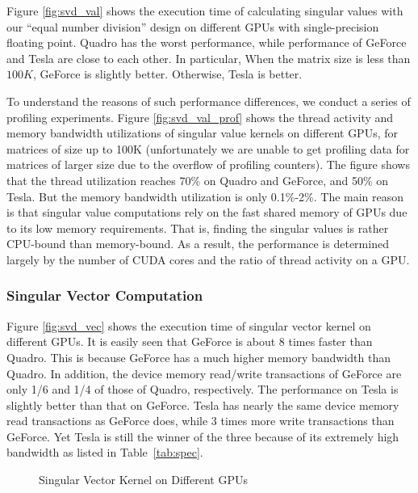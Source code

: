 Figure \ref{fig:svd_val} shows the execution time of calculating singular values with our ``equal number division'' design on different GPUs with single-precision floating point.
Quadro has the worst performance, while performance of GeForce and Tesla are close to each other.
In particular, When the matrix size is less than $100K$, GeForce is slightly better. Otherwise, Tesla is better. 

To understand the reasons
of such performance differences, we conduct a series of profiling experiments.
Figure \ref{fig:svd_val_prof} shows the thread activity and memory bandwidth utilizations of singular value kernels on different GPUs, for matrices of size up to 
100K (unfortunately we are unable to get profiling data for matrices of larger size due to the overflow of profiling counters). 
The figure shows that the thread utilization reaches 70\% on Quadro and GeForce, and 50\% on Tesla. 
But the memory bandwidth utilization is only 0.1\%-2\%.
The main reason is that singular value computations rely on the fast shared memory
of GPUs due to its low memory requirements. That is, finding the singular
values is rather CPU-bound than memory-bound. 
As a result, the performance is determined largely by the number of CUDA cores and the ratio of thread activity on a GPU.

\subsubsection{Singular Vector Computation}
Figure \ref{fig:svd_vec} shows the execution time of singular vector kernel on different GPUs. 
It is easily seen that GeForce is about 8 times faster than
Quadro. This is because GeForce has a much higher memory bandwidth
than Quadro.
In addition, the device memory read/write transactions of GeForce are only 1/6 and 1/4 of those of Quadro, respectively.
The performance on Tesla is slightly better than that on GeForce.
Tesla has nearly the same device memory read transactions as GeForce does, while 3 times more write transactions than GeForce.
Yet Tesla is still the winner of the three because of its extremely high
bandwidth as listed in Table~\ref{tab:spec}.

\begin{figure}[hbpt]
\centering
  \caption{Singular Vector Kernel on Different GPUs}
  \label{fig:svdvec}
\vspace{-0.2in}
\end{figure}

